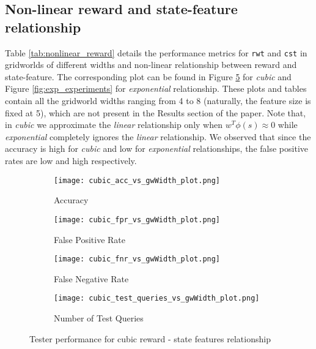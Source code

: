 \subsection{Non-linear reward and state-feature relationship}
Table \ref{tab:nonlinear_reward} details the performance metrics for \texttt{rwt} and \texttt{cst} in gridworlds of different widths and non-linear relationship between reward and state-feature. The corresponding plot can be found in Figure \ref{fig:cubic_experiments} for \textit{cubic} and Figure \ref{fig:exp_experiments} for \textit{exponential} relationship. These plots and tables contain all the gridworld widths ranging from 4 to 8 (naturally, the feature size is fixed at 5), which are not present in the Results section of the paper. Note that, in \textit{cubic} we approximate the \textit{linear} relationship only when $w^{T}\phi(s) \approx 0$ while \textit{exponential} completely ignores the \textit{linear} relationship. We observed that since the accuracy is high for \textit{cubic} and low for \textit{exponential} relationships, the false positive rates are low and high respectively.

\begin{figure}[h]
     \centering
     \begin{subfigure}[h]{0.4\textwidth}
         \centering
         \texttt{[image: cubic\_acc\_vs\_gwWidth\_plot.png]}
         \caption{Accuracy}
         \label{fig:cubic_acc_vs_features_plot}
     \end{subfigure}
    \hspace{5mm}
     \begin{subfigure}[h]{0.4\textwidth}
         \centering
         \texttt{[image: cubic\_fpr\_vs\_gwWidth\_plot.png]}
         \caption{False Positive Rate}
         \label{fig:cubic_fpr_vs_features_plot}
     \end{subfigure}
     \hspace{5mm}
     \begin{subfigure}[h]{0.4\textwidth}
         \centering
         \texttt{[image: cubic\_fnr\_vs\_gwWidth\_plot.png]}
         \caption{False Negative Rate}
         \label{fig:cubic_fnr_vs_features_plot}
     \end{subfigure}
     \hspace{5mm}
    \begin{subfigure}[h]{0.4\textwidth}
         \centering
         \texttt{[image: cubic\_test\_queries\_vs\_gwWidth\_plot.png]}
         \caption{Number of Test Queries}
         \label{fig:cubic_test_queries_vs_features_plot}
     \end{subfigure}
    \caption{Tester performance for cubic reward - state features relationship}
    \label{fig:cubic_experiments}
\end{figure}


